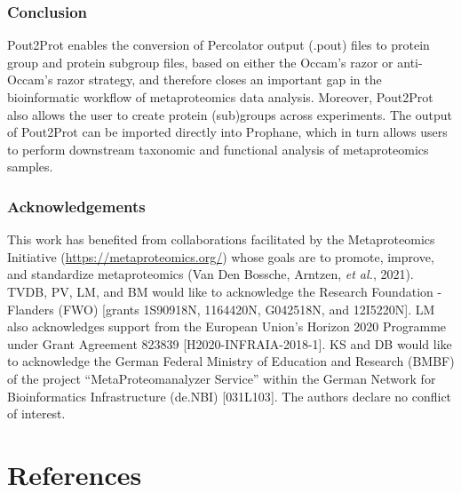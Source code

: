 \hypertarget{conclusion-2}{%
\subsection{Conclusion}\label{conclusion-2}}

Pout2Prot enables the conversion of Percolator output (.pout) files to
protein group and protein subgroup files, based on either the Occam's
razor or anti-Occam's razor strategy, and therefore closes an important
gap in the bioinformatic workflow of metaproteomics data analysis.
Moreover, Pout2Prot also allows the user to create protein (sub)groups
across experiments. The output of Pout2Prot can be imported directly
into Prophane, which in turn allows users to perform downstream
taxonomic and functional analysis of metaproteomics samples.

\hypertarget{acknowledgements-3}{%
\subsection{Acknowledgements}\label{acknowledgements-3}}

This work has benefited from collaborations facilitated by the
Metaproteomics Initiative (\url{https://metaproteomics.org/}) whose
goals are to promote, improve, and standardize metaproteomics (Van Den
Bossche, Arntzen, \emph{et al.}, 2021). TVDB, PV, LM, and BM would like
to acknowledge the Research Foundation - Flanders (FWO) {[}grants
1S90918N, 1164420N, G042518N, and 12I5220N{]}. LM also acknowledges
support from the European Union's Horizon 2020 Programme under Grant
Agreement 823839 {[}H2020-INFRAIA-2018-1{]}. KS and DB would like to
acknowledge the German Federal Ministry of Education and Research (BMBF)
of the project ``MetaProteomanalyzer Service'' within the German Network
for Bioinformatics Infrastructure (de.NBI) {[}031L103{]}. The authors
declare no conflict of interest.

\hypertarget{references}{%
\chapter*{References}\label{references}}

